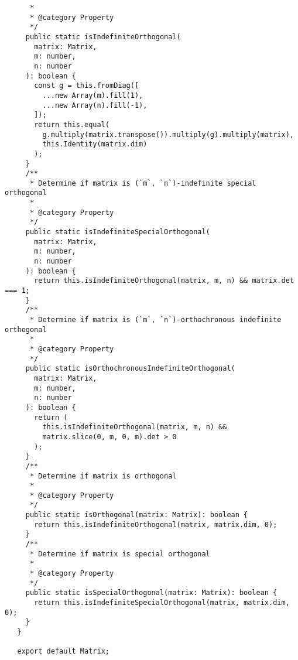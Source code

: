 \documentclass[../main.tex]{subfiles}
\begin{document}
\begin{verbatim}
      *
      * @category Property
      */
     public static isIndefiniteOrthogonal(
       matrix: Matrix,
       m: number,
       n: number
     ): boolean {
       const g = this.fromDiag([
         ...new Array(m).fill(1),
         ...new Array(n).fill(-1),
       ]);
       return this.equal(
         g.multiply(matrix.transpose()).multiply(g).multiply(matrix),
         this.Identity(matrix.dim)
       );
     }
     /**
      * Determine if matrix is (`m`, `n`)-indefinite special orthogonal
      *
      * @category Property
      */
     public static isIndefiniteSpecialOrthogonal(
       matrix: Matrix,
       m: number,
       n: number
     ): boolean {
       return this.isIndefiniteOrthogonal(matrix, m, n) && matrix.det === 1;
     }
     /**
      * Determine if matrix is (`m`, `n`)-orthochronous indefinite orthogonal
      *
      * @category Property
      */
     public static isOrthochronousIndefiniteOrthogonal(
       matrix: Matrix,
       m: number,
       n: number
     ): boolean {
       return (
         this.isIndefiniteOrthogonal(matrix, m, n) &&
         matrix.slice(0, m, 0, m).det > 0
       );
     }
     /**
      * Determine if matrix is orthogonal
      *
      * @category Property
      */
     public static isOrthogonal(matrix: Matrix): boolean {
       return this.isIndefiniteOrthogonal(matrix, matrix.dim, 0);
     }
     /**
      * Determine if matrix is special orthogonal
      *
      * @category Property
      */
     public static isSpecialOrthogonal(matrix: Matrix): boolean {
       return this.isIndefiniteSpecialOrthogonal(matrix, matrix.dim, 0);
     }
   }
   
   export default Matrix;
\end{verbatim}
\end{document}
